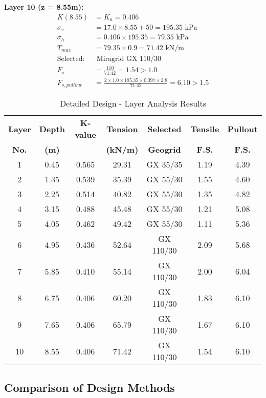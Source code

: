 \documentclass[10pt,a4paper,twocolumn]{article}
\begin{document}
\textbf{Layer 10 (z = 8.55m):}
\begin{align}
K(8.55) &= K_a = 0.406 \\
\sigma_v &= 17.0 \times 8.55 + 50 = 195.35 \text{ kPa} \\
\sigma_h &= 0.406 \times 195.35 = 79.35 \text{ kPa} \\
T_{max} &= 79.35 \times 0.9 = 71.42 \text{ kN/m} \\
\text{Selected:} &\text{ Miragrid GX 110/30} \\
F_s &= \frac{110}{71.42} = 1.54 > 1.0 \\
F_{s,pullout} &= \frac{2 \times 1.0 \times 195.35 \times 0.397 \times 2.8}{71.42} = 6.10 > 1.5
\end{align}
\begin{table}[h]
\centering
\caption{Detailed Design - Layer Analysis Results}
\label{tab:detailed_design}
\begin{tabular}{|c|c|c|c|c|c|c|}
\hline
\textbf{Layer} & \textbf{Depth} & \textbf{K-value} & \textbf{Tension} & \textbf{Selected} & \textbf{Tensile} & \textbf{Pullout} \\
\textbf{No.} & \textbf{(m)} & & \textbf{(kN/m)} & \textbf{Geogrid} & \textbf{F.S.} & \textbf{F.S.} \\
\hline
1 & 0.45 & 0.565 & 29.31 & GX 35/35 & 1.19 & 4.39 \\
\hline
2 & 1.35 & 0.539 & 35.39 & GX 55/30 & 1.55 & 4.60 \\
\hline
3 & 2.25 & 0.514 & 40.82 & GX 55/30 & 1.35 & 4.82 \\
\hline
4 & 3.15 & 0.488 & 45.48 & GX 55/30 & 1.21 & 5.08 \\
\hline
5 & 4.05 & 0.462 & 49.42 & GX 55/30 & 1.11 & 5.36 \\
\hline
6 & 4.95 & 0.436 & 52.64 & GX 110/30 & 2.09 & 5.68 \\
\hline
7 & 5.85 & 0.410 & 55.14 & GX 110/30 & 2.00 & 6.04 \\
\hline
8 & 6.75 & 0.406 & 60.20 & GX 110/30 & 1.83 & 6.10 \\
\hline
9 & 7.65 & 0.406 & 65.79 & GX 110/30 & 1.67 & 6.10 \\
\hline
10 & 8.55 & 0.406 & 71.42 & GX 110/30 & 1.54 & 6.10 \\
\hline
\end{tabular}
\end{table}



\subsection{Comparison of Design Methods}
\end{document}
